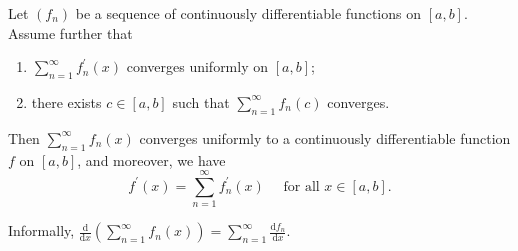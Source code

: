 \documentclass[a4paper]{article}
\begin{document}
\begin{theorem}\label{thm:5}
    Let $\left(f_{n}\right)$ be a sequence of continuously differentiable functions on $[a, b]$. Assume further that
    \begin{enumerate}
        \item $\sum_{n=1}^{\infty} f_{n}^{\prime}(x)$ converges uniformly on $[a, b]$;
        \item there exists $c \in[a, b]$ such that $\sum_{n=1}^{\infty} f_{n}(c)$ converges.
    \end{enumerate}
    Then $\sum_{n=1}^{\infty} f_{n}(x)$ converges uniformly to a continuously differentiable function $f$ on $[a, b]$, and moreover, we have
    \[
    f^{\prime}(x)=\sum_{n=1}^{\infty} f_{n}^{\prime}(x) \quad \text { for all } x \in[a, b].
    \]
\end{theorem}
\begin{note}
    Informally, $\displaystyle \frac{\mathrm{d}}{\mathrm{d}x}\left( \sum_{n=1}^{\infty}f_n(x) \right) = \sum_{n=1}^{\infty}\frac{\mathrm{d}f_n}{\mathrm{d}x}  $. 
\end{note}
\end{document}
